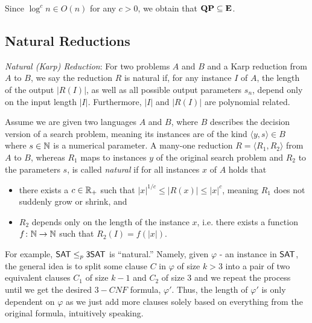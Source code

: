 \documentclass[11pt]{article}
\begin{document}
Since $\log^c n \in O(n)$ for any $c > 0$, we obtain that
$\mathbf{QP} \subseteq \mathbf{E}$.


\subsection{Natural Reductions}

\begin{definition}
	\textit{Natural (Karp) Reduction}: For two problems $A$ and $B$ and a Karp reduction from $A$ to $B$, we say the reduction $R$ is natural if, for any instance $I$ of $A$, the length of the output $|R(I)|$, as well as all possible output parameters $s_n$, depend only on the input length $|I|$. Furthermore, $|I|$ and $|R(I)|$ are polynomial related.
\end{definition}

\begin{definition}
  Assume we are given two languages $A$ and $B$, where $B$ describes the
  decision version of a search problem, meaning its instances are of the kind
  $\langle y, s \rangle \in B$ where $s \in {\mathbb{N}}$ is a numerical parameter.
  A many-one reduction $R = \langle R_1, R_2 \rangle$ from $A$ to $B$, whereas
  $R_1$ maps to instances $y$ of the original search problem and $R_2$ to the
  parameters $s$, is called \emph{natural} if for all instances $x$ of $A$ holds
  that
  \begin{itemize}
    \item there exists a $c \in {\mathbb R}_+$ such that
      $|x|^{1/c} \le |R(x)| \le |x|^c$, meaning $R_1$ does not suddenly grow or
      shrink, and
    \item $R_2$ depends only on the length of the instance $x$, i.e. there
      exists a function $f \colon {\mathbb{N}} \to {\mathbb{N}}$ such that $R_2(I) = f(|x|)$.
  \end{itemize}
\end{definition}
	
	For example, $\mathsf{SAT} \leq_p \mathsf{3SAT}$ is ``natural.'' Namely, given $\varphi$ - an instance in $\mathsf{SAT}$, the general idea is to split some clause $C$ in $\varphi$ of size $k > 3$ into a pair of two equivalent clauses $C_1$ of size $k - 1$ and $C_2$ of size $3$ and we repeat the process until we get the desired $3-CNF$ formula, $\varphi'$. Thus, the length of $\varphi'$ is only dependent on $\varphi$ as we just add more clauses solely based on everything from the original formula, intuitively speaking.
	
\end{document}
